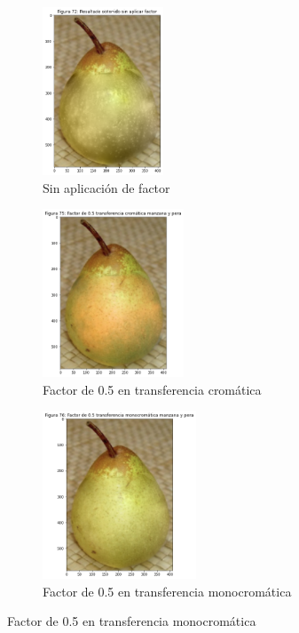 \documentclass[11pt,twoside,titlepage,a4paper]{article}
\numberwithin{equation}{section} %
\theoremstyle{usual}
\begin{document}
\begin{figure}[h]
    \centering
    \begin{subfigure}[t]{.3\textwidth}
        \centering
        \includegraphics[height=5cm]{imagenes/PoissonImageEditing_cell_84_output_0.png}
        \caption{Sin aplicación de factor}
        \label{fig:noAplicacionFactor}
    \end{subfigure}
    \centering
    \begin{subfigure}[t]{.3\textwidth}
        \centering
        \captionsetup{justification=centering}
        \includegraphics[height=5cm]{imagenes/PoissonImageEditing_cell_84_output_1.png}
        \caption{Factor de 0.5 en transferencia cromática}
        \label{fig:factor0.5Cromatica}
    \end{subfigure}%
    \centering
    \begin{subfigure}[t]{.3\textwidth}
        \centering
        \captionsetup{justification=centering}
        \includegraphics[height=5cm]{imagenes/PoissonImageEditing_cell_84_output_2.png}
        \caption{Factor de 0.5 en transferencia monocromática}

\end{subfigure}
\end{figure}
\end{document}
